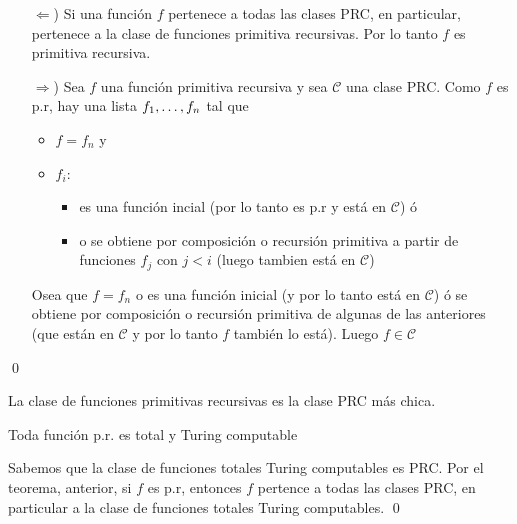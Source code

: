 	\begin{demo}
		\begin{itemize}
			\item[$\Leftarrow$)] Si una función $f$ pertenece a todas las clases PRC, en particular, pertenece a la clase de funciones primitiva recursivas. Por lo tanto $f$ es primitiva recursiva.
			\item[$\Rightarrow$)] Sea $f$ una función primitiva recursiva y sea $\mathcal{C}$ una clase PRC. Como $f$ es p.r, hay una lista $f_1,\dots, f_{n}$
			tal que
			\begin{itemize}
				\item $f = f_n$ y
				\item $f_i$:
				\begin{itemize}
				\item es una función incial (por lo tanto es p.r y está en $\mathcal{C}$) ó
				\item o se obtiene por composición o recursión primitiva a partir de funciones $f_j$ con $j < i$ (luego tambien está en $\mathcal{C}$)
				\end{itemize}
			\end{itemize}
			Osea que $f=f_n$ o es una función inicial (y por lo tanto está en $\mathcal{C}$) ó se obtiene por composición o recursión primitiva de algunas de las anteriores (que están en $\mathcal{C}$ y por lo tanto $f$ también lo está). Luego $f\in\mathcal{C}$
		\end{itemize}\qed
	\end{demo}

	\begin{corolario}
La clase de funciones primitivas recursivas es la clase PRC más chica.
	\end{corolario}
	
		\begin{corolario}\label{funcPrEsTotYComp}
Toda función p.r. es total y Turing computable
		\end{corolario}
		
	\begin{demo}[funcPrEsTotYComp]
	Sabemos que la clase de funciones totales Turing computables es PRC. Por el teorema, anterior, si $f$ es p.r, entonces $f$ pertence a todas las clases PRC, en particular a la clase de funciones totales Turing computables. \qed
	\end{demo}

